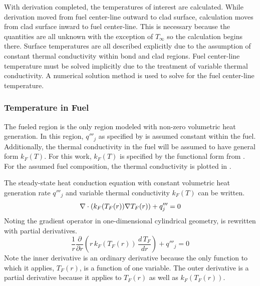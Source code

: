     With derivation completed, the temperatures of interest are calculated.
    While derivation moved from fuel center-line outward to clad surface,
    calculation moves from clad surface inward to fuel center-line. This is
    necessary because the quantities are all unknown with the exception of
    $T_{\infty}$ so the calculation begins there. Surface temperatures are all
    described explicitly due to the assumption of constant thermal conductivity
    within bond and clad regions. Fuel center-line temperature must be solved
    implicitly due to the treatment of variable thermal conductivity. A
    numerical solution method is used to solve for the fuel center-line
    temperature.
    
    \subsubsection{Temperature in Fuel}
      The fueled region is the only region modeled with non-zero volumetric heat
      generation. In this region, $q'''_j$ as specified by 
       is assumed constant within the fuel. 
      Additionally, the thermal conductivity in the fuel will be assumed to have
      general form $k_F(T)$. For this work, $k_F(T)$ is specified by the
      functional form from \cite{fuelProp}. For the assumed fuel composition, 
      the thermal conductivity is plotted in .

      The steady-state heat conduction equation with constant volumetric heat
      generation rate $q'''_j$ and variable thermal conductivity $k_F(T)$ can be
      written.
      \begin{equation}
        \label{eq:conduction_fuel}
        \mathbf{\nabla} \cdot (k_F(T_F(r)) \mathbf{\nabla} T_F(r)) + q'''_j = 0
      \end{equation}
      Noting the gradient operator in one-dimensional cylindrical geometry,
       is rewritten with partial derivatives.
      \begin{equation}
        \label{eq:conduction_fuel_cylindrical}
        \frac{1}{r} \frac{\partial}{\partial r} \left( r \, k_F(T_F(r)) \, 
          \frac{d \, T_F}{dr} \right) + q'''_j = 0
      \end{equation}
      Note the inner derivative is an ordinary derivative because the only
      function to which it applies, $T_F(r)$, is a function of one variable. The
      outer derivative is a partial derivative because it applies to $T_F(r)$ as
      well as $k_F(T_F(r))$.

